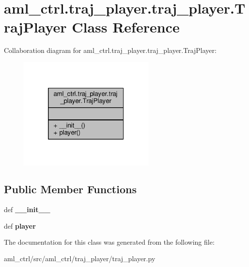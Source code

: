 \hypertarget{classaml__ctrl_1_1traj__player_1_1traj__player_1_1_traj_player}{\section{aml\-\_\-ctrl.\-traj\-\_\-player.\-traj\-\_\-player.\-Traj\-Player Class Reference}
\label{classaml__ctrl_1_1traj__player_1_1traj__player_1_1_traj_player}
}


Collaboration diagram for aml\-\_\-ctrl.\-traj\-\_\-player.\-traj\-\_\-player.\-Traj\-Player\-:
\nopagebreak
\begin{figure}[H]
\begin{center}
\leavevmode
\includegraphics[width=194pt]{classaml__ctrl_1_1traj__player_1_1traj__player_1_1_traj_player__coll__graph}
\end{center}
\end{figure}
\subsection*{Public Member Functions}
\begin{DoxyCompactItemize}
\item 
\hypertarget{classaml__ctrl_1_1traj__player_1_1traj__player_1_1_traj_player_a904f8610ebf2ca747afb7c9829dd2284}{def {\bfseries \-\_\-\-\_\-init\-\_\-\-\_\-}}\label{classaml__ctrl_1_1traj__player_1_1traj__player_1_1_traj_player_a904f8610ebf2ca747afb7c9829dd2284}

\item 
\hypertarget{classaml__ctrl_1_1traj__player_1_1traj__player_1_1_traj_player_a9332291fa8ab718dfc8e2434b4763321}{def {\bfseries player}}\label{classaml__ctrl_1_1traj__player_1_1traj__player_1_1_traj_player_a9332291fa8ab718dfc8e2434b4763321}

\end{DoxyCompactItemize}


The documentation for this class was generated from the following file\-:\begin{DoxyCompactItemize}
\item 
aml\-\_\-ctrl/src/aml\-\_\-ctrl/traj\-\_\-player/traj\-\_\-player.\-py\end{DoxyCompactItemize}
